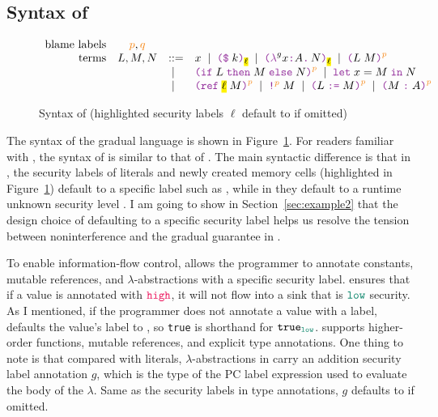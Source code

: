 \subsection{Syntax of \Surface}
\label{sec:surface-syntax}

\begin{figure}[tbp]
\raggedright
  {\small
  \[
  \begin{array}{rcll}
    \text{blame labels}         & \bl{p}, \bl{q}     &      & \\
    \text{terms}                & L , M , N & ::=  & x \MID \const{k}{\text{\hl{$\ell$}}} \MID \lam{g}{x}{A}{N}{\text{\hl{$\ell$}}} \MID \app{L}{M}{p} \\
    &                                       & \MID & \ifexp{L}{M}{N}{p} \MID \letexp{x}{M}{N} \\
    &                                       & \MID & \refexp{\text{\hl{$\ell$}}}{M}{p} \MID \deref{M}{p} \MID \assign{L}{M}{p} \MID \ann{M}{A}{p}
  \end{array}
  \]}
  \caption{Syntax of \Surface (highlighted security labels $\ell$ default to \low if omitted)}
  \label{fig:surface-syntax}
\end{figure}

%
The syntax of the gradual language \Surface is shown in
Figure~\ref{fig:surface-syntax}. For readers familiar with \GSLRef, the syntax
of \Surface is similar to that of \GSLRef. The main syntactic difference is that
in \Surface, the security labels of literals and newly created memory cells
(highlighted in Figure~\ref{fig:surface-syntax}) default to a specific label
such as \low, while in \GSLRef they default to a runtime unknown security level
\unk. I am going to show in Section~\ref{sec:example2} that the design choice of
defaulting to a specific security label helps us resolve the tension between
noninterference and the gradual guarantee in \Surface.

To enable information-flow control, \Surface allows the programmer to annotate
constants, mutable references, and $\lambda$-abstractions with a specific
security label. \Surface ensures that if a value is annotated with $\high$, it
will not flow into a sink that is $\low$ security. As I mentioned, if the
programmer does not annotate a value with a label, \Surface defaults the value's
label to \low, so \texttt{true} is shorthand for $\mathtt{true}_{\low}$.
\Surface supports higher-order functions, mutable references, and explicit type
annotations. One thing to note is that compared with literals,
$\lambda$-abstractions in \Surface carry an addition security label annotation
$g$, which is the type of the PC label expression used to evaluate the body of
the $\lambda$. Same as the security labels in type annotations, $g$ defaults to
\unk if omitted.


